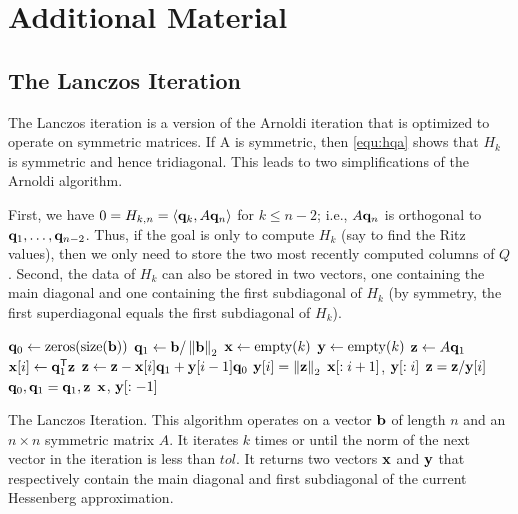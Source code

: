\section*{Additional Material} %

\subsection*{The Lanczos Iteration} %

The Lanczos iteration is a version of the Arnoldi iteration that is optimized to operate on symmetric matrices.
If A is symmetric, then \eqref{equ:hqa} shows that $H_k$ is symmetric and hence tridiagonal.
This leads to two simplifications of the Arnoldi algorithm.

First, we have $0=H_{k, n}=\langle \mathbf{q}_k, A\mathbf{q}_n \rangle$ for $k \leq n-2$; i.e., $A\mathbf{q}_n$ is orthogonal to $\mathbf{q}_1, \ldots, \mathbf{q}_{n-2}$.
Thus, if the goal is only to compute $H_k$ (say to find the Ritz values), then we only need to store the two most recently computed columns of $Q$.
Second, the data of $H_k$ can also be stored in two vectors, one containing the main diagonal and one containing the first subdiagonal of $H_k$
(by symmetry, the first superdiagonal equals the first subdiagonal of $H_k$).

\begin{algorithm}[H]
\begin{algorithmic}[1]
	\State $\q_0 \gets \zeros{\size{\b}}$								
	\State $\mathbf{q}_1 \gets \mathbf{b}/\left\lVert\mathbf{b}\right\rVert_2$
	\State $\x \gets \allocate{k}$
	\State $\y \gets \allocate{k}$
										
		\State $\mathbf{z} \gets A\mathbf{q}_1$					
		\State $\mathbf{x}[i] \gets \mathbf{q}_1^{\mathsf T} \mathbf{z}$				
		\State $\mathbf{z} \gets \mathbf{z} - \mathbf{x}[i] \mathbf{q}_1 + \mathbf{y}[i-1] \mathbf{q}_0$				
		\State $\mathbf{y}[i] = \left\lVert\mathbf{z}\right\rVert_2$						
										
			\State {} $\mathbf{x}[: i+1]$, $\mathbf{y}[: i]$
		\EndIf
		\State $\mathbf{z} = \mathbf{z}/ \mathbf{y}[i]$
		\State $\mathbf{q}_0, \mathbf{q}_1 = \mathbf{q}_1, \mathbf{z}$						
	\EndFor
	\State {} $\mathbf{x}$, $\mathbf{y}[: -1]$
\EndProcedure
\end{algorithmic}
\caption{The Lanczos Iteration. This algorithm operates on a vector $\mathbf{b}$ of length $n$ and an $n \times n$ symmetric matrix $A$. It iterates $k$ times or until the norm of the next vector in the iteration is less than $tol$. It returns two vectors $\mathbf{x}$ and $\mathbf{y}$ that respectively contain the main diagonal and first subdiagonal of the current Hessenberg approximation.}
\label{alg:lanczos_iteration}
\end{algorithm}

